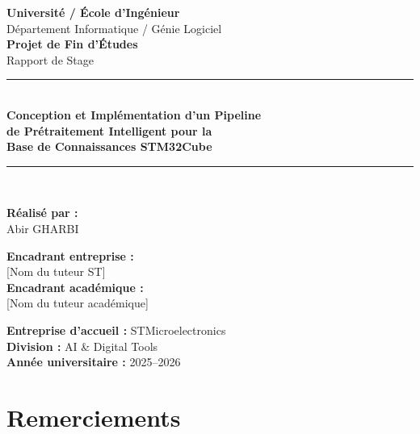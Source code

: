 \documentclass[12pt,a4paper]{report}
\begin{document}
\begin{titlepage}
\centering
\vspace*{1cm}

{\Large \textbf{Université / École d'Ingénieur}}\\[0.3cm]
{\large Département Informatique / Génie Logiciel}\\[2cm]

{\Huge \textbf{Projet de Fin d'Études}}\\[0.5cm]
{\LARGE Rapport de Stage}\\[1.5cm]

\rule{\textwidth}{1pt}\\[0.5cm]
{\huge \textbf{Conception et Implémentation d'un Pipeline\\de Prétraitement Intelligent pour la\\Base de Connaissances STM32Cube}}\\[0.5cm]
\rule{\textwidth}{1pt}\\[2cm]

\begin{minipage}{0.45\textwidth}
\begin{flushleft}
\textbf{Réalisé par :}\\
Abir GHARBI
\end{flushleft}
\end{minipage}
\hfill
\begin{minipage}{0.45\textwidth}
\begin{flushright}
\textbf{Encadrant entreprise :}\\
{[Nom du tuteur ST]}\\[0.5cm]
\textbf{Encadrant académique :}\\
{[Nom du tuteur académique]}
\end{flushright}
\end{minipage}

\vfill

\textbf{Entreprise d'accueil :} STMicroelectronics\\
\textbf{Division :} AI \& Digital Tools\\[0.5cm]
\textbf{Année universitaire :} 2025--2026

\end{titlepage}

\chapter*{Remerciements}
\end{document}

